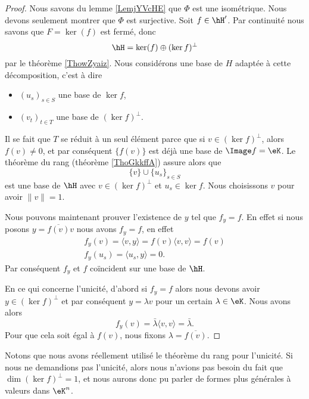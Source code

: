 \begin{proof}
    Nous savons du lemme \ref{LemjYVcHE} que \(\Phi\) est une isométrique. Nous devons seulement montrer que \( \Phi\) est surjective. Soit \( f\in \hH'\). Par continuité nous savons que \( F=\ker(f)\) est fermé, donc
    \begin{equation}
        \hH=\ker(f)\oplus(\ker f)^{\perp}
    \end{equation}
    par le théorème \ref{ThowZyaiz}. Nous considérons une base de \( H\) adaptée à cette décomposition, c'est à dire
    \begin{itemize}
        \item \( (u_s)_{s\in S}\) une base de \( \ker f\),
        \item
            \( (v_t)_{t\in T}\) une base de \( (\ker f)^{\perp}\).
    \end{itemize}
    Il se fait que \( T\) se réduit à un seul élément parce que si \( v\in (\ker f)^{\perp}\), alors \(  f(v)\neq 0\), et par conséquent \( \{  f(v) \}\) est déjà une base de \( \Image f=\eK\). Le théorème du rang (théorème \ref{ThoGkkffA}) assure alors que
    \begin{equation}
        \{ v \}\cup\{ u_s \}_{s\in S}
    \end{equation}
    est une base de \( \hH\) avec \( v\in(\ker f)^{\perp}\) et \( u_s\in \ker f\). Nous choisissons \( v\) pour avoir \( \| v \|=1\).

    Nous pouvons maintenant prouver l'existence de \( y\) tel que \(  f_y= f\). En effet si nous posons \( y=\overline{  f(v) }v\) nous avons \(  f_y= f\), en effet
    \begin{subequations}
        \begin{align}
             f_y(v)=\langle v, y\rangle = f(v)\langle v, v\rangle = f(v)\\
             f_y(u_s)=\langle u_s, y\rangle =0.
        \end{align}
    \end{subequations}
    Par conséquent \(  f_y\) et \(  f\) coïncident sur une base de \( \hH\).

    En ce qui concerne l'unicité, d'abord si \(  f_y= f\) alors nous devons avoir \( y\in(\ker f)^{\perp}\) et par conséquent \( y=\lambda v\) pour un certain \( \lambda\in \eK\). Nous avons alors
    \begin{equation}
         f_y(v)=\bar\lambda\langle v, v\rangle =\bar\lambda.
    \end{equation}
    Pour que cela soit égal à \(  f(v)\), nous fixons \( \lambda=\overline{  f(v) }\).
    
\end{proof}
Notons que nous avons réellement utilisé le théorème du rang pour l'unicité. Si nous ne demandions pas l'unicité, alors nous n'avions pas besoin du fait que \( \dim(\ker f)^{\perp}=1\), et nous aurons donc pu parler de formes plus générales à valeurs dans \( \eK^n\).

